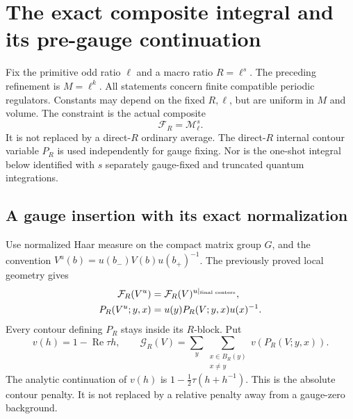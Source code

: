 \section{The exact composite integral and its pre-gauge continuation}
\label{cmi-section}

Fix the primitive odd ratio $\ell$ and a macro ratio $R=\ell^s$.
The preceding refinement is $M=\ell^k$. All statements concern
finite compatible periodic regulators. Constants may depend on the
fixed $R,\ell$, but are uniform in $M$ and volume. The constraint is
the actual composite
\[
 \mathcal F_R=\mathcal M_\ell^s.
\]
It is not replaced by a direct-$R$ ordinary average. The direct-$R$
internal contour variable $P_R$ is used independently for gauge
fixing. Nor is the one-shot integral below identified with $s$
separately gauge-fixed and truncated quantum integrations.

\subsection{A gauge insertion with its exact normalization}
\label{cmi-gauge-section}

Use normalized Haar measure on the compact matrix group $G$, and
the convention $V^u(b)=u(b_-)V(b)u(b_+)^{-1}$. The previously
proved local geometry gives
\begin{align}
 \mathcal F_R(V^u)
   &=\mathcal F_R(V)^{u|_{\text{final centers}}},\notag\\
 P_R(V^u;y,x)&=u(y)P_R(V;y,x)u(x)^{-1}.                 \label{cmi-covariance}
\end{align}
Every contour defining $P_R$ stays inside its $R$-block.
Put
\begin{equation}\label{cmi-penalty}
 v(h)=1-\operatorname{Re}\tau h,\qquad
 \mathcal G_R(V)=\sum_y\sum_{\substack{x\in B_R(y)\\x\ne y}}
                       v(P_R(V;y,x)).
\end{equation}
The analytic continuation of $v(h)$ is
$1-\tfrac12\tau(h+h^{-1})$. This is the absolute contour
penalty. It is not replaced by a relative penalty away from
a gauge-zero background.

